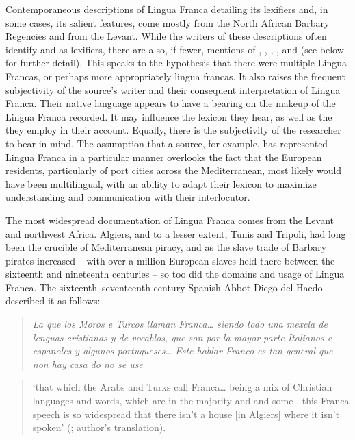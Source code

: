 \documentclass[output=paper]{langsci/langscibook}
\begin{document}
	Contemporaneous descriptions of Lingua Franca detailing its lexifiers and, in some cases, its salient features, come mostly from the North African Barbary Regencies and from the Levant. While the writers of these descriptions often identify  and  as lexifiers, there are also, if fewer, mentions of , , , ,  and  (see below for further detail). This speaks to the hypothesis that there were multiple Lingua Francas, or perhaps more appropriately lingua francas. It also raises the frequent subjectivity of the source’s writer and their consequent interpretation of Lingua Franca. Their native language appears to have a bearing on the makeup of the Lingua Franca recorded. It may influence the lexicon they hear, as well as the  they employ in their account. Equally, there is the subjectivity of the researcher to bear in mind. The assumption that a  source, for example, has represented Lingua Franca in a particular manner overlooks the fact that the European residents, particularly of port cities across the Mediterranean, most likely would have been multilingual, with an ability to adapt their lexicon to maximize understanding and communication with their interlocutor. 
	
	The most widespread documentation of Lingua Franca comes from the Levant and northwest Africa. Algiers, and to a lesser extent, Tunis and Tripoli, had long been the crucible of Mediterranean piracy, and as the slave trade of Barbary pirates increased – with over a million European slaves held there between the sixteenth and nineteenth centuries \citep[23]{Davis2004} – so too did the domains and usage of Lingua Franca. The sixteenth–seventeenth century Spanish Abbot Diego del Haedo described it as follows: 
	
	\begin{quote}
	\textit{La que los Moros e Turcos llaman Franca… siendo todo una mexcla de lenguas cristianas y de vocablos, que son por la mayor parte Italianos e espanoles y algunos portugueses… Este hablar Franco es tan general que non hay casa do no se use}
	\end{quote}
	
	\begin{quote}
	‘that which the Arabs and Turks call Franca… being a mix of Christian languages and words, which are in the majority  and  and some , this Franca speech is so widespread that there isn’t a house [in Algiers] where it isn’t spoken’  (\citealt[24]{Haedo1612}; author’s translation).
	\end{quote}
	
\end{document}

